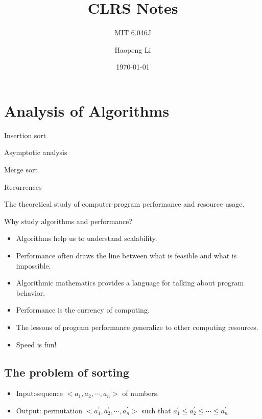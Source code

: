 \documentclass[11pt,toc=twocol]{elegantbook}
\title{CLRS Notes}
\subtitle{MIT 6.046J}
\author{Haopeng Li}
\date{\today}
\begin{document}
\maketitle

\frontmatter
\tableofcontents

\mainmatter

\chapter{Analysis of Algorithms}
\begin{introduction}
  \item Insertion sort
  \item Asymptotic analysis
  \item Merge sort
  \item Recurrences
\end{introduction}
\begin{definition}[Algorithms]
  The theoretical study of computer-program performance and resource usage.
\end{definition}

\begin{note}
  Why study algorithms and performance?
  \begin{itemize}
    \item Algorithms help us to understand scalability.
    \item Performance often draws the line between what is feasible and what is impossible.
    \item Algorithmic mathematics provides a language for talking about program behavior.
    \item Performance is the currency of computing.
    \item The lessons of program performance generalize to other computing resources.
    \item Speed is fun!
  \end{itemize}
\end{note}
\section{The problem of sorting}
\begin{problem}
\begin{itemize}
  \item Input:sequence $<a_{1},a_{2},\cdots,a_{n}>$ of numbers.
  \item Output: permutation $<a_{1}^{\prime},a_2^{\prime},\cdots,a_{n}^{\prime}>$ such that $a_{1}^{\prime} \leq a_{2}^{\prime} \leq \cdots \leq a_{n}^{\prime}$
\end{itemize}
\end{problem}
\end{document}
